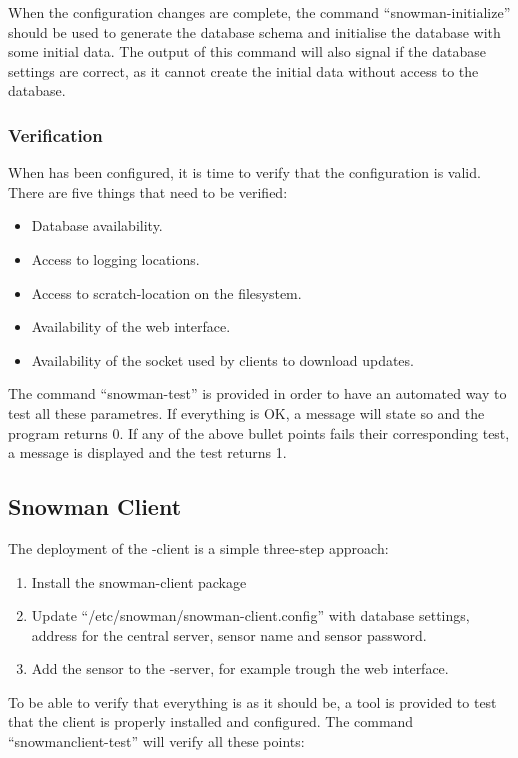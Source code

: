 When the configuration changes are complete, the command ``snowman-initialize''
should be used to generate the database schema and initialise the database with
some initial data. The output of this command will also signal if the
database settings are correct, as it cannot create the initial data without
access to the database.

\subsubsection{Verification}

When \snowman{} has been configured, it is time to verify that the configuration
is valid. There are five things that need to be verified:

\begin{itemize}
  \item Database availability.
  \item Access to logging locations.
  \item Access to scratch-location on the filesystem.
  \item Availability of the web interface.
  \item Availability of the socket used by clients to download updates.
\end{itemize}

The command ``snowman-test'' is provided in order to have an automated way to
test all these parametres. If everything is OK, a message will state so and the
program returns 0. If any of the above bullet points fails their corresponding
test, a message is displayed and the test returns 1.

\subsection{Snowman Client}

The deployment of the \snowman{}-client is a simple three-step approach:

\begin{enumerate}
  \item Install the snowman-client package
  \item Update ``/etc/snowman/snowman-client.config'' with database settings,
  address for the central server, sensor name and sensor password.
  \item Add the sensor to the \snowman{}-server, for example trough the
  web interface.
\end{enumerate}

To be able to verify that everything is as it should be, a tool is provided
to test that the client is properly installed and configured. The command
``snowmanclient-test'' will verify all these points:

